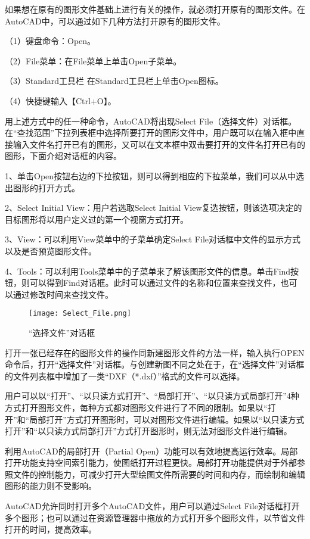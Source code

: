 如果想在原有的图形文件基础上进行有关的操作，就必须打开原有的图形文件。在AutoCAD中，可以通过如下几种方法打开原有的图形文件。

（1）键盘命令：Open。

（2）File菜单：在File菜单上单击Open子菜单。

（3）Standard工具栏 在Standard工具栏上单击Open图标。

（4）快捷键输入【Ctrl+O】。

用上述方式中的任一种命令，AutoCAD将出现Select File（选择文件）对话框。在“查找范围”下拉列表框中选择所要打开的图形文件中，用户既可以在输入框中直接输入文件名打开已有的图形，又可以在文本框中双击要打开的文件名打开已有的图形，下面介绍对话框的内容。

1、单击Open按钮右边的下拉按钮，则可以得到相应的下拉菜单，我们可以从中选出图形的打开方式。

2、Select Initial View：用户若选取Select Initial View复选按钮，则该选项决定的目标图形将以用户定义过的第一个视窗方式打开。

3、View：可以利用View菜单中的子菜单确定Select File对话框中文件的显示方式以及是否预览图形文件。

4、Tools：可以利用Tools菜单中的子菜单来了解该图形文件的信息。单击Find按钮，则可以得到Find对话框。此时可以通过文件的名称和位置来查找文件，也可以通过修改时间来查找文件。

\begin{figure}[htbp]
\centering
\texttt{[image: Select\_File.png]}
\caption{“选择文件”对话框}
\end{figure}

打开一张已经存在的图形文件的操作同新建图形文件的方法一样，输入执行OPEN命令后，打开“选择文件”对话框。与创建新图不同之处在于，在“选择文件”对话框的文件列表框中增加了一类“DXF（*.dxf）”格式的文件可以选择。

用户可以以“打开”、“以只读方式打开”、“局部打开”、“以只读方式局部打开”4种方式打开图形文件，每种方式都对图形文件进行了不同的限制。如果以“打开”和“局部打开”方式打开图形时，可以对图形文件进行编辑。如果以“以只读方式打开”和“以只读方式局部打开”方式打开图形时，则无法对图形文件进行编辑。

利用AutoCAD的局部打开（Partial Open）功能可以有效地提高运行效率。局部打开功能支持空间索引能力，使图纸打开过程更快。局部打开功能提供对于外部参照文件的控制能力，可减少打开大型绘图文件所需要的时间和内存，而绘制和编辑图形的能力则不受影响。

AutoCAD允许同时打开多个AutoCAD文件，用户可以通过Select File对话框打开多个图形；也可以通过在资源管理器中拖放的方式打开多个图形文件，以节省文件打开的时间，提高效率。

